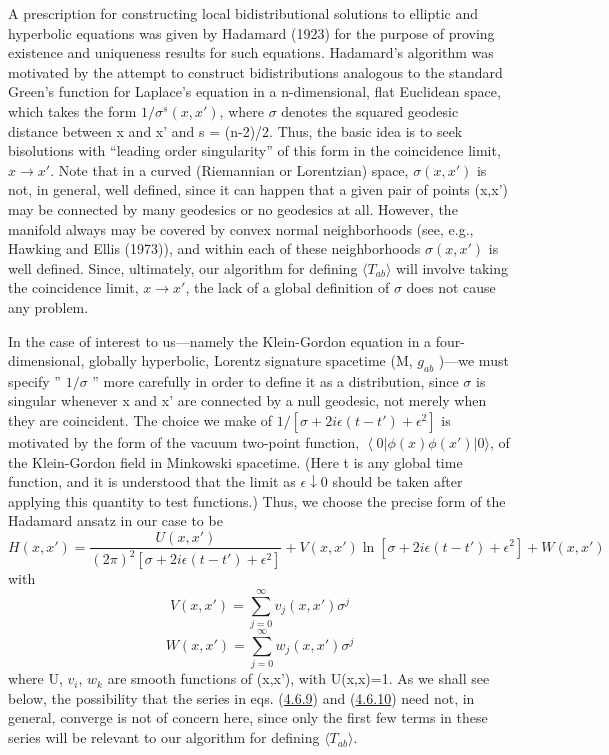 \documentclass[11pt,a4paper]{article}
\providecommand{\bra}[1]{\left\langle#1\right\rvert}
\begin{document}
A prescription for constructing local bidistributional solutions to elliptic and hyperbolic equations was given by Hadamard (1923) for the purpose of proving existence and uniqueness results for such equations. Hadamard's algorithm was motivated by the attempt to construct bidistributions analogous to the standard Green's function for Laplace's equation in a n-dimensional, flat Euclidean space, which takes the form \(1/\sigma^s(x,x')\), where \(\sigma\) denotes the squared geodesic distance between x and x' and s = (n-2)/2. Thus, the basic idea is to seek bisolutions with ``leading order singularity'' of this form in the coincidence limit, \(x \rightarrow x'\). Note that in a curved (Riemannian or Lorentzian) space, \(\sigma(x,x')\) is not, in general, well defined, since it can happen that a given pair of points (x,x') may be connected by many geodesics or no geodesics at all. However, the manifold always may be covered by convex normal neighborhoods (see, e.g., Hawking and Ellis (1973)), and within each of these neighborhoods \(\sigma(x,x')\) is well defined. Since, ultimately, our algorithm for defining \(\langle T_{ab}\rangle\) will involve taking the coincidence limit, \(x \rightarrow x'\), the lack of a global definition of \(\sigma\) does not cause any problem.

In the case of interest to us---namely the Klein-Gordon equation in a four-dimensional, globally hyperbolic, Lorentz signature spacetime (M, \(g_{ab}\) )---we must specify '' \(1/\sigma\) '' more carefully in order to define\hypertarget{source-105}{} it as a distribution, since \(\sigma\) is singular whenever x and x' are connected by a null geodesic, not merely when they are coincident. The choice we make of \(1/[\sigma+2i\epsilon(t-t')+\epsilon^2]\) is motivated by the form of the vacuum two-point function, \(\bra0 \phi(x)\phi(x')\lvert 0\rangle \), of the Klein-Gordon field in Minkowski spacetime. (Here t is any global time function, and it is understood that the limit as \(\epsilon\downarrow 0\) should be taken after applying this quantity to test functions.) Thus, we choose the precise form of the Hadamard ansatz in our case to be
\begin{equation*}
H(x,x') = \frac{U(x,x')}{(2\pi)^2[\sigma + 2i\epsilon(t-t') + \epsilon^2]} + V(x,x') \ln[\sigma + 2i\epsilon(t-t') + \epsilon^2] + W(x,x') \tag{4.6.8}\label{eq:4.6.8}
\end{equation*}
with
\begin{equation*}
V(x,x') = \sum_{j=0}^{\infty} v_j(x,x') \sigma^j \tag{4.6.9}\label{eq:4.6.9}
\end{equation*}
\begin{equation*}
W(x,x') = \sum_{j=0}^{\infty} w_j(x,x') \sigma^j \tag{4.6.10}\label{eq:4.6.10}
\end{equation*}
where U, \(v_i\), \(w_k\) are smooth functions of (x,x'), with U(x,x)=1. As we shall see below, the possibility that the series in eqs. (\hyperref[eq:4.6.9]{4.6.9}) and (\hyperref[eq:4.6.10]{4.6.10}) need not, in general, converge is not of concern here, since only the first few terms in these series will be relevant to our algorithm for defining \(\langle T_{ab}\rangle \).
\end{document}
